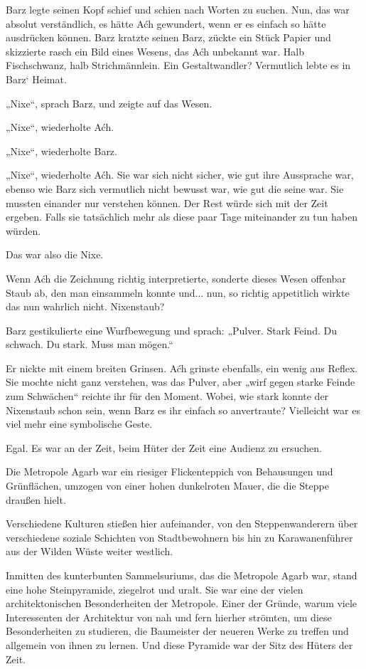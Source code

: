 Barz legte seinen Kopf schief und schien nach Worten zu suchen. Nun, das war absolut verständlich, es hätte Aćh gewundert, wenn er es einfach so hätte ausdrücken können. Barz kratzte seinen Barz, zückte ein Stück Papier und skizzierte rasch ein Bild eines Wesens, das Aćh unbekannt war. Halb Fischschwanz, halb Strichmännlein. Ein Gestaltwandler? Vermutlich lebte es in Barz‘ Heimat.

„Nixe“, sprach Barz, und zeigte auf das Wesen.

„Nixe“, wiederholte Aćh.

„Nixe“, wiederholte Barz.

„Nixe“, wiederholte Aćh. Sie war sich nicht sicher, wie gut ihre Aussprache war, ebenso wie Barz sich vermutlich nicht bewusst war, wie gut die seine war. Sie mussten einander nur verstehen können. Der Rest würde sich mit der Zeit ergeben. Falls sie tatsächlich mehr als diese paar Tage miteinander zu tun haben würden.

Das war also die Nixe.

Wenn Aćh die Zeichnung richtig interpretierte, sonderte dieses Wesen offenbar Staub ab, den man einsammeln konnte und... nun, so richtig appetitlich wirkte das nun wahrlich nicht. Nixenstaub?

Barz gestikulierte eine Wurfbewegung und sprach: „Pulver. Stark Feind. Du schwach. Du stark. Muss man mögen.“

Er nickte mit einem breiten Grinsen. Aćh grinste ebenfalls, ein wenig aus Reflex. Sie mochte nicht ganz verstehen, was das Pulver, aber „wirf gegen starke Feinde zum Schwächen“ reichte ihr für den Moment. Wobei, wie stark konnte der Nixenstaub schon sein, wenn Barz es ihr einfach so anvertraute? Vielleicht war es viel mehr eine symbolische Geste.

Egal. Es war an der Zeit, beim Hüter der Zeit eine Audienz zu ersuchen.\bigskip




Die Metropole Agarb war ein riesiger Flickenteppich von Behausungen und Grünflächen, umzogen von einer hohen dunkelroten Mauer, die die Steppe draußen hielt.

Verschiedene Kulturen stießen hier aufeinander, von den Steppenwanderern über verschiedene soziale Schichten von Stadtbewohnern bis hin zu Karawanenführer aus der Wilden Wüste weiter westlich.

Inmitten des kunterbunten Sammelsuriums, das die Metropole Agarb war, stand eine hohe Steinpyramide, ziegelrot und uralt. Sie war eine der vielen architektonischen Besonderheiten der Metropole. Einer der Gründe, warum viele Interessenten der Architektur von nah und fern hierher strömten, um diese Besonderheiten zu studieren, die Baumeister der neueren Werke zu treffen und allgemein von ihnen zu lernen. Und diese Pyramide war der Sitz des Hüters der Zeit.

